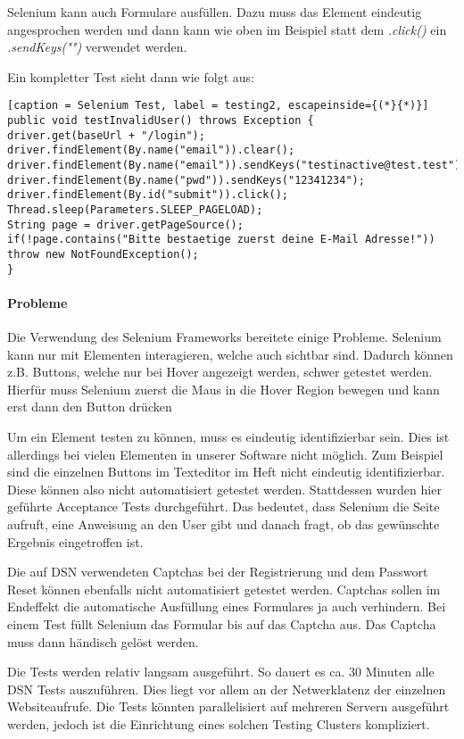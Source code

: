 Selenium kann auch Formulare ausfüllen. Dazu muss das Element eindeutig angesprochen werden und dann kann wie oben im Beispiel statt dem \textit{.click()} ein \textit{.sendKeys("")} verwendet werden. 

\newpage

Ein kompletter Test sieht dann wie folgt aus:
\begin{lstlisting}[caption = Selenium Test, label = testing2, escapeinside={(*}{*)}]
public void testInvalidUser() throws Exception {
driver.get(baseUrl + "/login");
driver.findElement(By.name("email")).clear();
driver.findElement(By.name("email")).sendKeys("testinactive@test.test");
driver.findElement(By.name("pwd")).sendKeys("12341234");
driver.findElement(By.id("submit")).click();
Thread.sleep(Parameters.SLEEP_PAGELOAD);
String page = driver.getPageSource();
if(!page.contains("Bitte bestaetige zuerst deine E-Mail Adresse!")) throw new NotFoundException();
}
\end{lstlisting}

\paragraph{Probleme}
Die Verwendung des Selenium Frameworks bereitete einige Probleme. Selenium kann nur mit Elementen interagieren, welche auch sichtbar sind. Dadurch können z.B. Buttons, welche nur bei Hover angezeigt werden, schwer getestet werden. Hierfür muss Selenium zuerst die Maus in die Hover Region bewegen und kann erst dann den Button drücken 

Um ein Element testen zu können, muss es eindeutig identifizierbar sein. Dies ist allerdings bei vielen Elementen in unserer Software nicht möglich. Zum Beispiel sind die einzelnen Buttons im Texteditor im Heft nicht eindeutig identifizierbar. Diese können also nicht automatisiert getestet werden. Stattdessen wurden hier geführte Acceptance Tests durchgeführt. Das bedeutet, dass Selenium die Seite aufruft, eine Anweisung an den User gibt und danach fragt, ob das gewünschte Ergebnis eingetroffen ist. 

Die auf DSN verwendeten Captchas bei der Registrierung und dem Passwort Reset können ebenfalls nicht automatisiert getestet werden. Captchas sollen im Endeffekt die automatische Ausfüllung eines Formulares ja auch verhindern. Bei einem Test füllt Selenium das Formular bis auf das Captcha aus. Das Captcha muss dann händisch gelöst werden. 

Die Tests werden relativ langsam ausgeführt. So dauert es ca. 30 Minuten alle DSN Tests auszuführen. Dies liegt vor allem an der Netwerklatenz der einzelnen Websiteaufrufe. Die Tests könnten parallelisiert auf mehreren Servern ausgeführt werden, jedoch ist die Einrichtung eines solchen Testing Clusters kompliziert.
